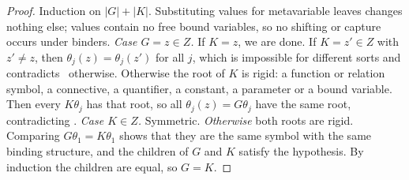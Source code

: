 \begin{proof}
Induction on $|G|+|K|$. Substituting values for metavariable leaves changes nothing else; values contain no free bound variables, so no shifting or capture occurs under binders.
\emph{Case $G=z\in Z$.} If $K=z$, we are done. If $K=z'\in Z$ with $z'\neq z$, then $\theta_j(z)=\theta_j(z')$ for all $j$, which is impossible for different sorts and contradicts \evD\ otherwise. Otherwise the root of $K$ is rigid: a function or relation symbol, a connective, a quantifier, a constant, a parameter or a bound variable. Then every $K\theta_j$ has that root, so all $\theta_j(z)=G\theta_j$ have the same root, contradicting \evR.
\emph{Case $K\in Z$.} Symmetric.
\emph{Otherwise} both roots are rigid. Comparing $G\theta_1=K\theta_1$ shows that they are the same symbol with the same binding structure, and the children of $G$ and $K$ satisfy the hypothesis. By induction the children are equal, so $G=K$.
\end{proof}


